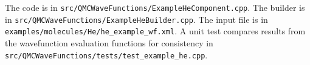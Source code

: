 The code is in \texttt{src/QMCWaveFunctions/ExampleHeComponent.cpp}.
The builder is in \texttt{src/QMCWaveFunctions/ExampleHeBuilder.cpp}.
The input file is in \texttt{examples/molecules/He/he\_example\_wf.xml}.
A unit test compares results from the wavefunction evaluation functions for
consistency in \texttt{src/QMCWaveFunctions/tests/test\_example\_he.cpp}.

